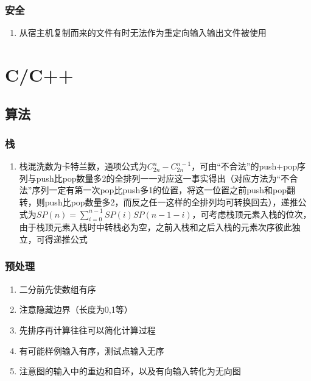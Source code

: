 \documentclass[onecolumn]{article}
\begin{document}
        \subsubsection{安全}
            \noindent
            \begin{enumerate}
                \item 从宿主机复制而来的文件有时无法作为重定向输入输出文件被使用
            \end{enumerate}
\newpage
\section{C/C++}
    \subsection{算法}
        \subsubsection{栈}
            \noindent
            \begin{enumerate}
                \item 栈混洗数为卡特兰数，通项公式为$C_{2n}^n-C_{2n}^{n-1}$，可由“不合法”的push+pop序列与push比pop数量多2的全排列一一对应这一事实得出（对应方法为“不合法”序列一定有第一次pop比push多1的位置，将这一位置之前push和pop翻转，则push比pop数量多2，而反之任一这样的全排列均可转换回去），递推公式为$SP(n)=\sum_{i=0}^{n-1}SP(i)SP(n-1-i)$，可考虑栈顶元素入栈的位次，由于栈顶元素入栈时中转栈必为空，之前入栈和之后入栈的元素次序彼此独立，可得递推公式
            \end{enumerate}
        \subsubsection{预处理}
            \noindent
            \begin{enumerate}
                \item 二分前先使数组有序
                \item 注意隐藏边界（长度为0,1等）
                \item 先排序再计算往往可以简化计算过程
                \item 有可能样例输入有序，测试点输入无序
                \item 注意图的输入中的重边和自环，以及有向输入转化为无向图
            \end{enumerate}
\end{document}
